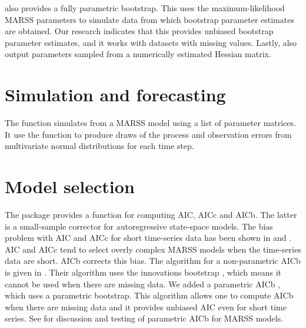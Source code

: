 \verb@MARSSboot@ also provides a fully parametric bootstrap.  This uses the maximum-likelihood MARSS parameters to simulate data from which bootstrap parameter estimates are obtained.  Our research \citep{HolmesWard2010} indicates that this provides unbiased bootstrap parameter estimates, and it works with datasets with missing values.  Lastly, \verb@MARSSboot@ also output parameters sampled from a numerically estimated Hessian matrix.  

\section{Simulation and forecasting}
The \verb@MARSSsimulate@{} function simulates from a MARSS model using a list of parameter matrices.  It use the \verb@mvrnorm@ function to produce draws of the process and observation errors from multivariate normal distributions for each time step.  

\section{Model selection}
The package provides a \verb@MARSSaic@{} function for computing AIC, AICc and AICb.  The latter is a small-sample corrector for autoregressive state-space models.  The bias problem with AIC and AICc for short time-series data has been shown in \citet{CavanaughShumway1997} and \citet{HolmesWard2010}.  AIC and AICc tend to select overly complex MARSS models when the time-series data are short.  AICb corrects this bias.  The algorithm for a non-parametric AICb is given in \citet{CavanaughShumway1997}.  Their algorithm uses the innovations bootstrap \citep{StofferWall1991}, which means it cannot be used when there are missing data.  We added a parametric AICb \citep{HolmesWard2010}, which uses a parametric bootstrap. This algorithm allows one to compute AICb when there are missing data and it provides unbiased AIC even for short time series.  See \citet{HolmesWard2010} for discussion and testing of parametric AICb for MARSS models. 

